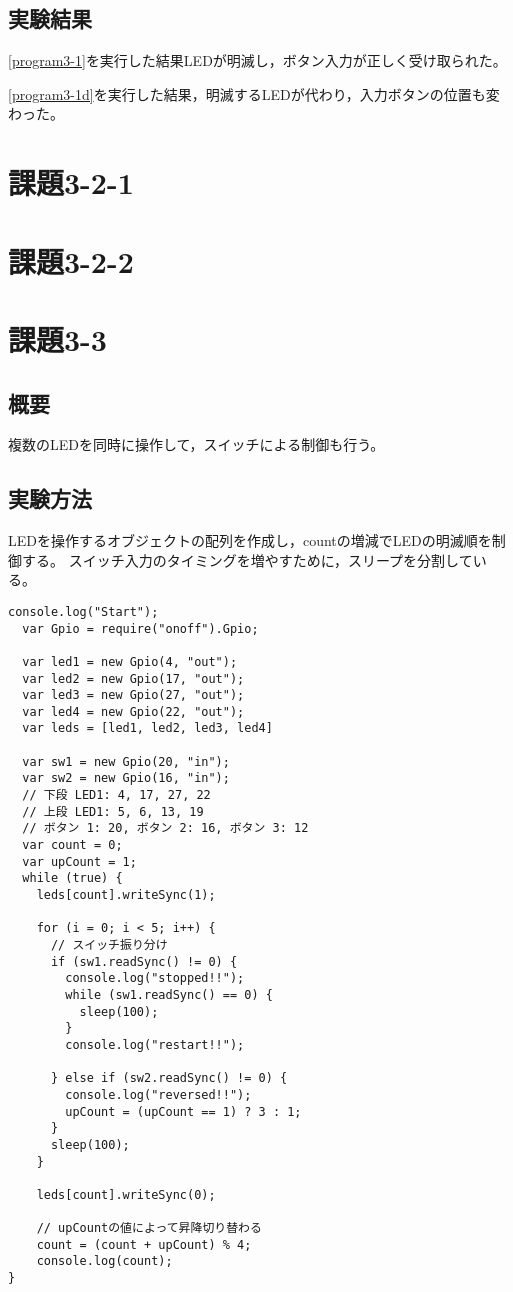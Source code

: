 \documentclass[a4paper,10pt]{jsarticle}
\begin{document}
\subsection{実験結果}
\ref{program3-1}を実行した結果LEDが明滅し，ボタン入力が正しく受け取られた。

\ref{program3-1d}を実行した結果，明滅するLEDが代わり，入力ボタンの位置も変わった。

\section{課題3-2-1}

\section{課題3-2-2}

\section{課題3-3}
\subsection{概要}
複数のLEDを同時に操作して，スイッチによる制御も行う。

\subsection{実験方法}
LEDを操作するオブジェクトの配列を作成し，countの増減でLEDの明滅順を制御する。
スイッチ入力のタイミングを増やすために，スリープを分割している。

\begin{lstlisting}[caption={program3-3},label={program3-3}]
  console.log("Start");
  var Gpio = require("onoff").Gpio;

  var led1 = new Gpio(4, "out");
  var led2 = new Gpio(17, "out");
  var led3 = new Gpio(27, "out");
  var led4 = new Gpio(22, "out");
  var leds = [led1, led2, led3, led4]

  var sw1 = new Gpio(20, "in");
  var sw2 = new Gpio(16, "in");
  // 下段 LED1: 4, 17, 27, 22
  // 上段 LED1: 5, 6, 13, 19
  // ボタン 1: 20, ボタン 2: 16, ボタン 3: 12
  var count = 0;
  var upCount = 1;
  while (true) {
    leds[count].writeSync(1);

    for (i = 0; i < 5; i++) {
      // スイッチ振り分け
      if (sw1.readSync() != 0) {
        console.log("stopped!!");
        while (sw1.readSync() == 0) {
          sleep(100);
        }
        console.log("restart!!");

      } else if (sw2.readSync() != 0) {
        console.log("reversed!!");
        upCount = (upCount == 1) ? 3 : 1;
      }
      sleep(100);
    }

    leds[count].writeSync(0);

    // upCountの値によって昇降切り替わる
    count = (count + upCount) % 4;
    console.log(count);
}
\end{lstlisting}
\end{document}
